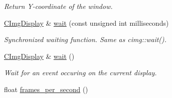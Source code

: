 \begin{DoxyCompactItemize}
\begin{DoxyCompactList}\small\item\em Return Y-\/coordinate of the window. \item\end{DoxyCompactList}\item 
\hyperlink{structcimg__library_1_1_c_img_display}{CImgDisplay} \& \hyperlink{structcimg__library_1_1_c_img_display_a96efe590da16f2e5b4510b2fde423c67}{wait} (const unsigned int milliseconds)
\begin{DoxyCompactList}\small\item\em Synchronized waiting function. Same as cimg::wait(). \item\end{DoxyCompactList}\item 
\hypertarget{structcimg__library_1_1_c_img_display_aa5e3e882409a68ca12a6aacfcbd09ed3}{
\hyperlink{structcimg__library_1_1_c_img_display}{CImgDisplay} \& \hyperlink{structcimg__library_1_1_c_img_display_aa5e3e882409a68ca12a6aacfcbd09ed3}{wait} ()}
\label{structcimg__library_1_1_c_img_display_aa5e3e882409a68ca12a6aacfcbd09ed3}

\begin{DoxyCompactList}\small\item\em Wait for an event occuring on the current display. \item\end{DoxyCompactList}\item 
\hypertarget{structcimg__library_1_1_c_img_display_a07f1827308cf863d49883a83de65bf8d}{
float \hyperlink{structcimg__library_1_1_c_img_display_a07f1827308cf863d49883a83de65bf8d}{frames\_\-per\_\-second} ()}
\label{structcimg__library_1_1_c_img_display_a07f1827308cf863d49883a83de65bf8d}


\end{DoxyCompactItemize}
